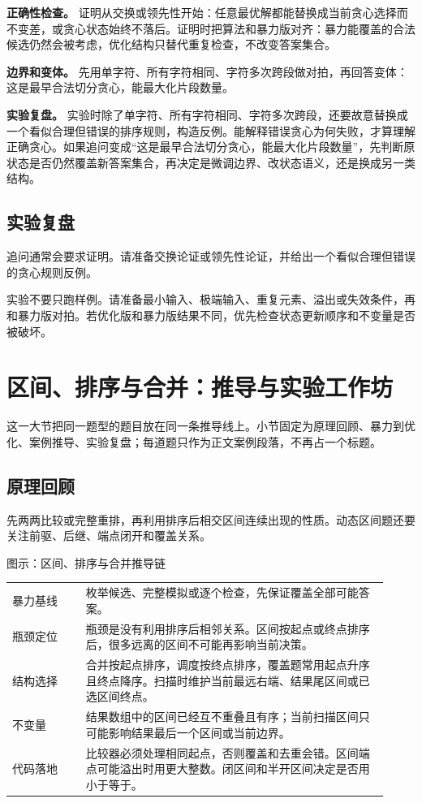 \textbf{正确性检查。} 证明从交换或领先性开始：任意最优解都能替换成当前贪心选择而不变差，或贪心状态始终不落后。证明时把算法和暴力版对齐：暴力能覆盖的合法候选仍然会被考虑，优化结构只替代重复检查，不改变答案集合。

\textbf{边界和变体。} 先用单字符、所有字符相同、字符多次跨段做对拍，再回答变体：这是最早合法切分贪心，能最大化片段数量。

\textbf{实验复盘。} 实验时除了单字符、所有字符相同、字符多次跨段，还要故意替换成一个看似合理但错误的排序规则，构造反例。能解释错误贪心为何失败，才算理解正确贪心。如果追问变成“这是最早合法切分贪心，能最大化片段数量”，先判断原状态是否仍然覆盖新答案集合，再决定是微调边界、改状态语义，还是换成另一类结构。

\subsection{实验复盘}

追问通常会要求证明。请准备交换论证或领先性论证，并给出一个看似合理但错误的贪心规则反例。

实验不要只跑样例。请准备最小输入、极端输入、重复元素、溢出或失效条件，再和暴力版对拍。若优化版和暴力版结果不同，优先检查状态更新顺序和不变量是否被破坏。

\section{区间、排序与合并：推导与实验工作坊}
这一大节把同一题型的题目放在同一条推导线上。小节固定为原理回顾、暴力到优化、案例推导、实验复盘；每道题只作为正文案例段落，不再占一个标题。

\subsection{原理回顾}

先两两比较或完整重排，再利用排序后相交区间连续出现的性质。动态区间题还要关注前驱、后继、端点闭开和覆盖关系。

\begin{principlebox}{图示：区间、排序与合并推导链}
\begin{tabular}{@{}p{0.18\linewidth}p{0.74\linewidth}@{}}
暴力基线 & 枚举候选、完整模拟或逐个检查，先保证覆盖全部可能答案。\\
瓶颈定位 & 瓶颈是没有利用排序后相邻关系。区间按起点或终点排序后，很多远离的区间不可能再影响当前决策。\\
结构选择 & 合并按起点排序，调度按终点排序，覆盖题常用起点升序且终点降序。扫描时维护当前最远右端、结果尾区间或已选区间终点。\\
不变量 & 结果数组中的区间已经互不重叠且有序；当前扫描区间只可能影响结果最后一个区间或当前边界。\\
代码落地 & 比较器必须处理相同起点，否则覆盖和去重会错。区间端点可能溢出时用更大整数。闭区间和半开区间决定是否用小于等于。\\
\end{tabular}
\end{principlebox}

